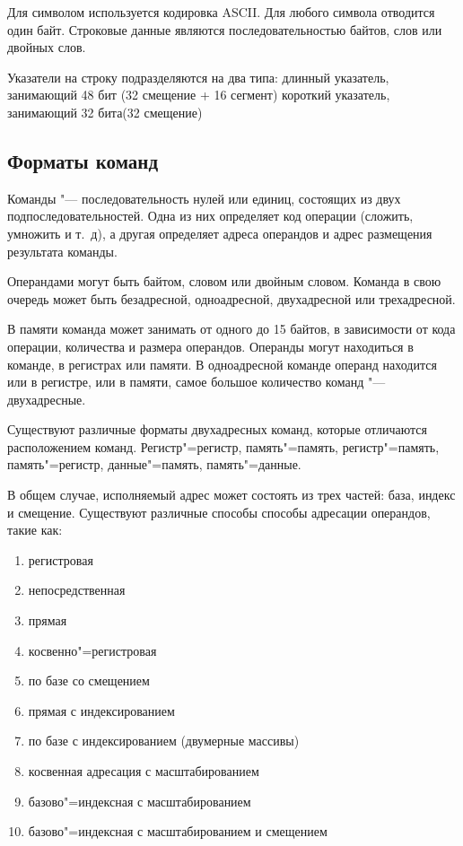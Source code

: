 Для символом используется кодировка ASCII. Для любого символа отводится один байт.
Строковые данные являются последовательностью байтов, слов или двойных слов.

Указатели на строку подразделяются на два типа:
длинный указатель, занимающий 48 бит (32 смещение + 16 сегмент)
короткий указатель, занимающий 32 бита(32 смещение)

\subsection{Форматы команд}

Команды "--- последовательность нулей или единиц, состоящих из двух подпоследовательностей.
Одна из них определяет код операции (сложить, умножить и т.~д), а другая определяет адреса операндов
и адрес размещения результата команды.

Операндами могут быть байтом, словом или двойным словом. Команда в свою очередь может быть безадресной, 
одноадресной, двухадресной или трехадресной.

В памяти команда может занимать от одного до 15 байтов, в зависимости от кода операции, количества и
размера операндов. Операнды могут находиться в команде, в регистрах или памяти. В одноадресной команде
операнд находится или в регистре, или в памяти, самое большое количество команд "--- двухадресные.

Существуют различные форматы двухадресных команд, которые отличаются расположением команд.
Регистр"=регистр, память"=память, регистр"=память, память"=регистр, данные"=память, память"=данные.

В общем случае, исполняемый адрес может состоять из трех частей: база, индекс и смещение.
Существуют различные способы способы адресации операндов, такие как:
\begin{enumerate}
    \item регистровая
    \item непосредственная
    \item прямая
    \item косвенно"=регистровая
    \item по базе со смещением
    \item прямая с индексированием
    \item по базе с индексированием (двумерные массивы)
    \item косвенная адресация с масштабированием
    \item базово"=индексная с масштабированием
    \item базово"=индексная с масштабированием и смещением
    
\end{enumerate}


